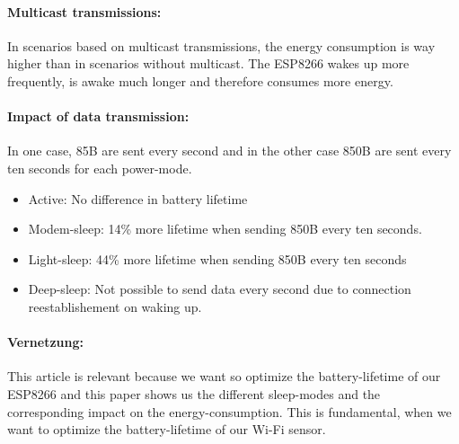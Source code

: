 \documentclass{report}
\begin{document}
\paragraph{Multicast transmissions:}
In scenarios based on multicast transmissions, the energy consumption is way higher than in scenarios without multicast. The ESP8266 wakes up more frequently, is awake much longer and therefore consumes more energy.
\paragraph{Impact of data transmission:}
In one case, 85B are sent every second and in the other case 850B are sent every ten seconds for each power-mode.
\begin{itemize}
        \item Active: No difference in battery lifetime
        \item Modem-sleep: 14\% more lifetime when sending 850B every ten seconds.
        \item Light-sleep: 44\% more lifetime when sending 850B every ten seconds
        \item Deep-sleep: Not possible to send data every second due to connection reestablishement on waking up.
    \end{itemize}
\paragraph{Vernetzung:}
This article is relevant because we want so optimize the battery-lifetime of our ESP8266 and this paper shows us the different sleep-modes and the corresponding impact on the energy-consumption. This is fundamental, when we want to optimize the battery-lifetime of our Wi-Fi sensor.
\end{document}
